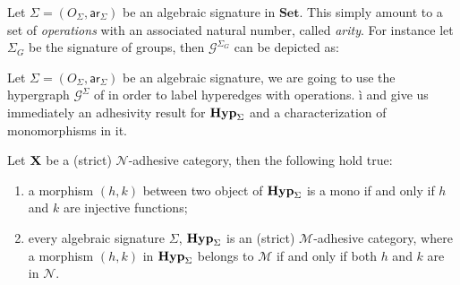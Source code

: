 \documentclass[runningheads,envcountsect]{llncs}
\newcommand{\Set}{\mathbf{Set}}
\def\X{\textbf {\textup{X}}}
\newcommand{\catname}[1]{\textbf{\textup{#1}}}
\newcommand{\hyp}{\catname{Hyp}}
\newcommand{\hyps}{\catname{Hyp}_{\Sigma}}
\newcommand{\ari}{\mathsf{ar}}
\begin{document}
\begin{example}\label{exa_3} Let $\Sigma=(O_\Sigma, \ari_\Sigma)$ be an algebraic signature in $\Set$. This simply amount to a set of \emph{operations} with an associated natural number, called \emph{arity}. 	For instance let $\Sigma_G$ be the signature of groups, then $\mathcal{G}^{\Sigma_G}$ can be depicted as:
	\begin{center}
	\end{center}
\end{example}

Let $\Sigma=(O_\Sigma, \ari_\Sigma)$ be an algebraic signature, we are going to use the hypergraph $\mathcal{G}^{\Sigma}$ of  in order to label hyperedges with operations.
ì
 and  give us immediately an adhesivity result for $\hyp_{\Sigma}$ and a characterization of monomorphisms in it.
\begin{proposition}\label{prop:mono} Let $\X$ be a (strict) $\mathcal{N}$-adhesive category, then the following hold true:
	\begin{enumerate}
		\item a morphism $(h,k)$ between two object of $\hyp_{\Sigma}$ is a mono if and only if $h$ and $k$ are injective functions;
		\item every algebraic signature $\Sigma$, $\hyps$ is an (strict) $\mathcal{M}$-adhesive category, where a morphism $(h,k)$ in $\hyps$ belongs to $\mathcal{M}$ if and only if both $h$ and $k$ are in $\mathcal{N}$. 
	\end{enumerate}
\end{proposition}
\end{document}
